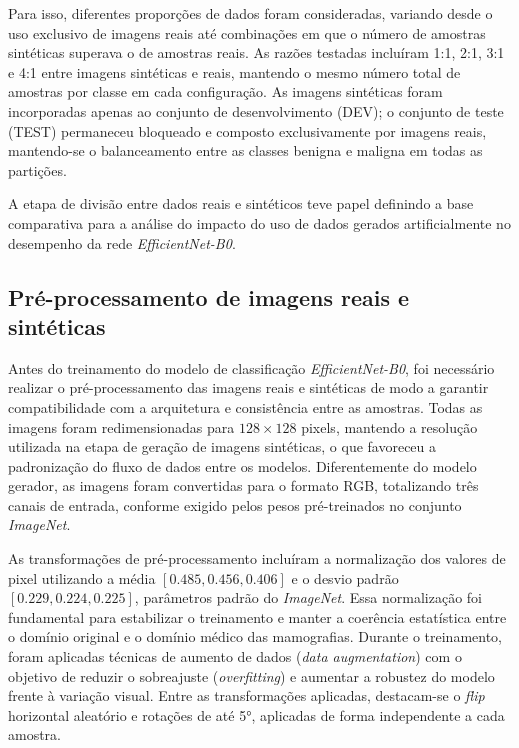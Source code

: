 \documentclass[
	12pt,				%
	openright,			%
	oneside,			%
	a4paper,			%
	tcc,			%
	]{ABNT-DC-UEL}
\begin{document}
Para isso, diferentes proporções de dados foram consideradas, variando desde o uso exclusivo de imagens reais até combinações em que o número de amostras sintéticas superava o de amostras reais. As razões testadas incluíram 1:1, 2:1, 3:1 e 4:1 entre imagens sintéticas e reais, mantendo o mesmo número total de amostras por classe em cada configuração. As imagens sintéticas foram incorporadas apenas ao conjunto de desenvolvimento (DEV); o conjunto de teste (TEST) permaneceu bloqueado e composto exclusivamente por imagens reais, mantendo-se o balanceamento entre as classes benigna e maligna em todas as partições.

A etapa de divisão entre dados reais e sintéticos teve papel definindo a base comparativa para a análise do impacto do uso de dados gerados artificialmente no desempenho da rede \textit{EfficientNet-B0}.

\subsection{Pré-processamento de imagens reais e sintéticas}

Antes do treinamento do modelo de classificação \textit{EfficientNet-B0}, foi necessário realizar o pré-processamento das imagens reais e sintéticas de modo a garantir compatibilidade com a arquitetura e consistência entre as amostras. Todas as imagens foram redimensionadas para $128 \times 128$ pixels, mantendo a resolução utilizada na etapa de geração de imagens sintéticas, o que favoreceu a padronização do fluxo de dados entre os modelos. Diferentemente do modelo gerador, as imagens foram convertidas para o formato RGB, totalizando três canais de entrada, conforme exigido pelos pesos pré-treinados no conjunto \textit{ImageNet}.

As transformações de pré-processamento incluíram a normalização dos valores de pixel utilizando a média $[0.485, 0.456, 0.406]$ e o desvio padrão $[0.229, 0.224, 0.225]$, parâmetros padrão do \textit{ImageNet}. Essa normalização foi fundamental para estabilizar o treinamento e manter a coerência estatística entre o domínio original e o domínio médico das mamografias. Durante o treinamento, foram aplicadas técnicas de aumento de dados (\textit{data augmentation}) com o objetivo de reduzir o sobreajuste (\textit{overfitting}) e aumentar a robustez do modelo frente à variação visual. Entre as transformações aplicadas, destacam-se o \textit{flip} horizontal aleatório e rotações de até 5°, aplicadas de forma independente a cada amostra.
\end{document}
